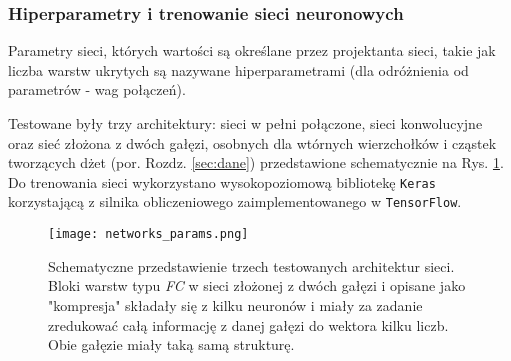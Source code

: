 \subsubsection*{Hiperparametry i trenowanie sieci neuronowych}

Parametry sieci, których wartości są określane przez projektanta sieci, takie jak liczba warstw ukrytych są nazywane hiperparametrami (dla odróżnienia od parametrów - wag połączeń).

Testowane były trzy architektury: sieci w pełni połączone, sieci konwolucyjne oraz sieć złożona z dwóch gałęzi, osobnych dla wtórnych wierzchołków i cząstek tworzących dżet (por. Rozdz. \ref{sec:dane}) przedstawione schematycznie na Rys. \ref{fig:nets-params}.
Do trenowania sieci wykorzystano wysokopoziomową bibliotekę \texttt{Keras} korzystającą z silnika obliczeniowego zaimplementowanego w \texttt{TensorFlow}.

\begin{figure}[h]
	\centering
	\texttt{[image: networks\_params.png]}
	\caption{Schematyczne przedstawienie trzech testowanych architektur sieci. Bloki warstw typu \textit{FC} w sieci złożonej z dwóch gałęzi i opisane jako "kompresja" składały się z kilku neuronów i miały za zadanie zredukować całą informację z danej gałęzi do wektora kilku liczb. Obie gałęzie miały taką samą strukturę.}
	\label{fig:nets-params}
\end{figure}


